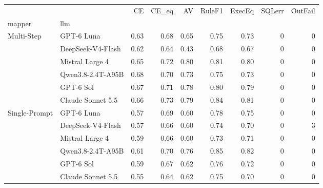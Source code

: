 \begin{tabular}{llrrrrrrr}
\toprule
 &  & CE & CE_eq & AV & RuleF1 & ExecEq & SQLerr & OutFail \\
mapper & llm &  &  &  &  &  &  &  \\
\midrule
\multirow[t]{6}{*}{Multi-Step} & GPT-6 Luna & 0.63 & 0.68 & 0.65 & 0.75 & 0.73 & 0 & 0 \\
 & DeepSeek-V4-Flash & 0.62 & 0.64 & 0.43 & 0.68 & 0.67 & 0 & 0 \\
 & Mistral Large 4 & 0.65 & 0.72 & 0.80 & 0.81 & 0.80 & 0 & 0 \\
 & Qwen3.8-2.4T-A95B & 0.68 & 0.70 & 0.73 & 0.75 & 0.73 & 0 & 0 \\
 & GPT-6 Sol & 0.67 & 0.71 & 0.78 & 0.80 & 0.79 & 0 & 0 \\
 & Claude Sonnet 5.5 & 0.66 & 0.73 & 0.79 & 0.84 & 0.81 & 0 & 0 \\
\cline{1-9}
\multirow[t]{6}{*}{Single-Prompt} & GPT-6 Luna & 0.57 & 0.69 & 0.60 & 0.78 & 0.75 & 0 & 0 \\
 & DeepSeek-V4-Flash & 0.57 & 0.66 & 0.60 & 0.74 & 0.70 & 0 & 3 \\
 & Mistral Large 4 & 0.59 & 0.66 & 0.60 & 0.73 & 0.71 & 0 & 0 \\
 & Qwen3.8-2.4T-A95B & 0.61 & 0.70 & 0.76 & 0.85 & 0.82 & 0 & 0 \\
 & GPT-6 Sol & 0.59 & 0.67 & 0.62 & 0.76 & 0.72 & 0 & 0 \\
 & Claude Sonnet 5.5 & 0.55 & 0.64 & 0.62 & 0.75 & 0.70 & 0 & 0 \\
\cline{1-9}
\bottomrule
\end{tabular}
